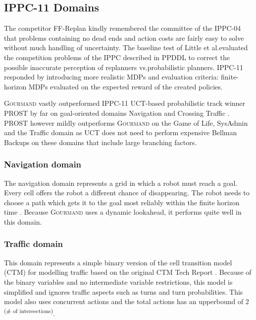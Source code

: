 \documentclass[runningheads,a4paper]{llncs}
\begin{document}
\subsection{IPPC-11 Domains}

The competitor FF-Replan \cite{FFReplan} kindly remembered the committee of the IPPC-04 that problems containing no dead ends and action costs are fairly easy to solve without much handling of uncertainty. The baseline test of Little et al.\@ evaluated the competition problems of the IPPC described in PPDDL to correct the possible inaccurate perception of replanners vs.\@ probabilistic planners. IPPC-11 responded by introducing more realistic MDPs and evaluation criteria: finite-horizon MDPs evaluated on the expected reward of the created policies.

\textsc{Gourmand} vastly outperformed IPPC-11 UCT-based probabilistic track winner PROST by far on goal-oriented domains Navigation and Crossing Traffic \cite{kolobov2012gourmand}. PROST however mildly outperforms \textsc{Gourmand} on the Game of Life, SysAdmin and the Traffic domain as UCT does not need to perform expensive Bellman Backups on these domains that include large branching factors.

\subsubsection{Navigation domain}

The navigation domain represents a grid in which a robot must reach a goal. Every cell offers the robot a different chance of disappearing. The robot needs to choose a path which gets it to the goal most reliably within the finite horizon time \cite{sanner2011navigation}. Because \textsc{Gourmand} uses a dynamic lookahead, it performs quite well in this domain.


\subsubsection{Traffic domain}
This domain represents a simple binary version of the cell transition model (CTM) for modelling traffic based on the original CTM Tech Report \cite{sanner2011traffic}. Because of the binary variables and no intermediate variable restrictions, this model is simplified and ignores traffic aspects such as turns and turn probabilities. This model also uses concurrent actions and the total actions has an upperbound of 2\textsuperscript{ (\# of intersections)}.
\end{document}
